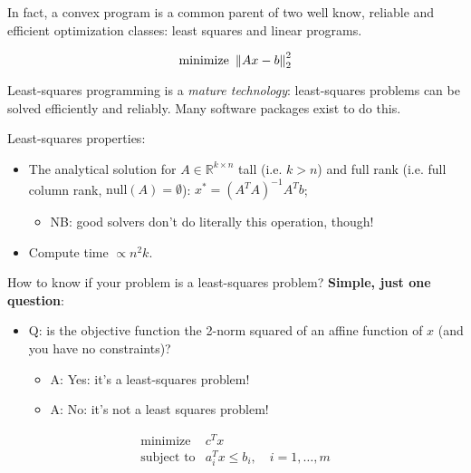 In fact, a convex program is a common parent of two well know, reliable and efficient optimization classes: least squares and linear programs.


\begin{Definition}
	\begin{equation*}
		\text{minimize}\,\, \left\|Ax-b\right\|_{2}^2
	\end{equation*}
\end{Definition}

Least-squares programming is a \textit{mature technology}: least-squares problems can be solved efficiently and reliably. Many software packages exist to do this.

\begin{Fact}
	Least-squares properties:
	\begin{itemize}
		\item The analytical solution for $A\in\mathbb R^{k\times n}$ tall (i.e. $k>n$) and full rank (i.e. full column rank, $\text{null}(A)=\emptyset$): $x^*=(A^TA)^{-1}A^Tb$;
		\begin{itemize}
			\item NB: good solvers don't do literally this operation, though!
		\end{itemize}
		\item Compute time $\propto n^2k$.
	\end{itemize}
\end{Fact}

How to know if your problem is a least-squares problem? \textbf{Simple, just one question}:

\begin{itemize}
	\item Q: is the objective function the 2-norm squared of an affine function of $x$ (and you have no constraints)?
	\begin{itemize}
		\item A: Yes: it's a least-squares problem!
		\item A: No: it's not a least squares problem!
	\end{itemize}
\end{itemize}


\begin{Definition}
	$$
	\begin{array}{rl}
	\text{minimize} & c^Tx \\
	\text{subject to} & a_i^Tx\le b_i,\quad i=1,\ldots,m
	\end{array}
	$$
\end{Definition}



